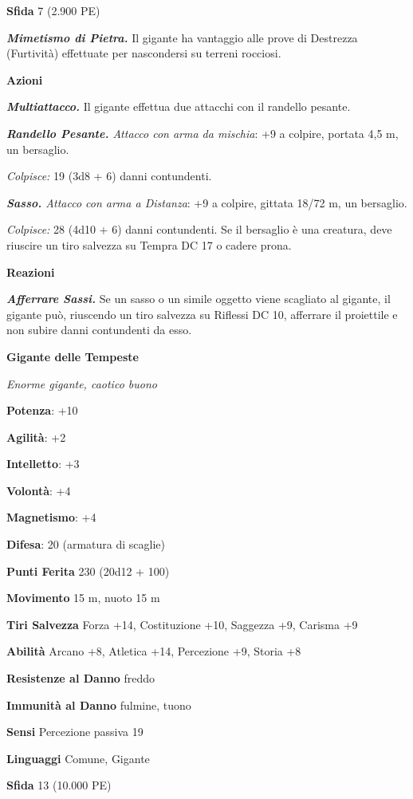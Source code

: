 \begin{multicols}{2}
\textbf{Sfida} 7 (2.900 PE)

\emph{\textbf{Mimetismo di Pietra.}} Il gigante ha vantaggio alle prove
di Destrezza (Furtività) effettuate per nascondersi su terreni rocciosi.

\textbf{Azioni}

\emph{\textbf{Multiattacco.}} Il gigante effettua due attacchi con il
randello pesante.

\emph{\textbf{Randello Pesante.} Attacco con arma da mischia}: +9 a
colpire, portata 4,5 m, un bersaglio.

\emph{Colpisce:} 19 (3d8 + 6) danni contundenti.

\emph{\textbf{Sasso.} Attacco con arma a Distanza}: +9 a colpire,
gittata 18/72 m, un bersaglio.

\emph{Colpisce:} 28 (4d10 + 6) danni contundenti. Se il bersaglio è una
creatura, deve riuscire un tiro salvezza su Tempra DC 17 o cadere prona.

\textbf{Reazioni}

\emph{\textbf{Afferrare Sassi.}} Se un sasso o un simile oggetto viene
scagliato al gigante, il gigante può, riuscendo un tiro salvezza su Riflessi DC 10, afferrare il proiettile e non subire danni contundenti
da esso.

\textbf{Gigante delle Tempeste}

\emph{Enorme gigante, caotico buono}

\textbf{Potenza}: +10

\textbf{Agilità}: +2

\textbf{Intelletto}: +3

\textbf{Volontà}: +4

\textbf{Magnetismo}: +4

\textbf{Difesa}: 20 (armatura di scaglie)

\textbf{Punti Ferita} 230 (20d12 + 100)

\textbf{Movimento} 15 m, nuoto 15 m

\textbf{Tiri Salvezza} Forza +14, Costituzione +10, Saggezza +9, Carisma
+9

\textbf{Abilità} Arcano +8, Atletica +14, Percezione +9, Storia +8

\textbf{Resistenze al Danno} freddo

\textbf{Immunità al Danno} fulmine, tuono

\textbf{Sensi} Percezione passiva 19

\textbf{Linguaggi} Comune, Gigante

\textbf{Sfida} 13 (10.000 PE)


\end{multicols}
